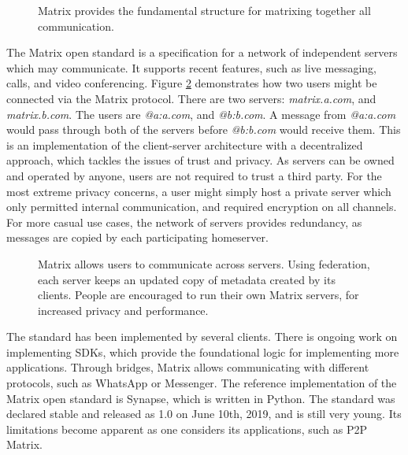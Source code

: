 \begin{figure}
    \centering
    \caption{Matrix provides the fundamental structure for matrixing together all communication.}
    \label{fig:matrixing_together}
\end{figure}

The Matrix open standard\cite{matrix_org_spec} is a specification for a network of independent servers which may communicate.
It supports recent features, such as live messaging, calls, and video conferencing.
Figure \ref{fig:matrix_structure} demonstrates how two users might be connected via the Matrix protocol.
There are two servers: \textit{matrix.a.com}, and \textit{matrix.b.com}.
The users are \textit{@a:a.com}, and \textit{@b:b.com}.
A message from \textit{@a:a.com} would pass through both of the servers before \textit{@b:b.com} would receive them.
This is an implementation of the client-server architecture with a decentralized approach, which tackles the issues of trust and privacy.
As servers can be owned and operated by anyone, users are not required to trust a third party.
For the most extreme privacy concerns, a user might simply host a private server which only permitted internal communication, and required encryption on all channels.
For more casual use cases, the network of servers provides redundancy, as messages are copied by each participating homeserver.

\begin{figure}
    \centering
    \resizebox{0.7\linewidth}{!}{}
    \caption{
        Matrix allows users to communicate across servers.
        Using federation, each server keeps an updated copy of metadata created by its clients.
        People are encouraged to run their own Matrix servers, for increased privacy and performance.
    }
    \label{fig:matrix_structure}
\end{figure}

The standard has been implemented by several clients\cite{matrix_org_clients}.
There is ongoing work on implementing SDKs\cite{matrix_org_sdks}, which provide the foundational logic for implementing more applications.
Through bridges, Matrix allows communicating with different protocols\cite{matrix_org_bridges}, such as WhatsApp or Messenger.
The reference implementation of the Matrix open standard is Synapse\cite{matrix_org_synapse}, which is written in Python.
The standard was declared stable and released as 1.0 on June 10th, 2019\cite{matrix_org_spec}, and is still very young.
Its limitations become apparent as one considers its applications, such as \ac{P2P} Matrix.


